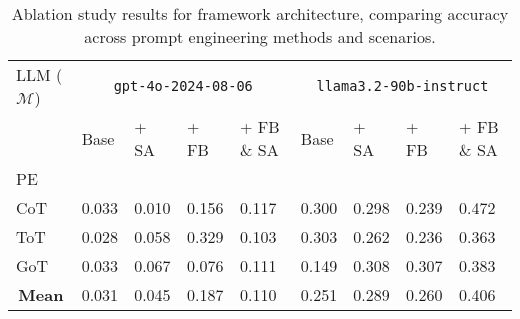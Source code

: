 \begin{table*}[!t]
\caption{Ablation study results for framework architecture, comparing accuracy across prompt engineering methods and scenarios.}
\label{tab:ablation_study}
\begin{tabular}{p{2.2cm}|p{1.5cm}p{1.5cm}p{1.5cm}p{1.5cm}|p{1.5cm}p{1.5cm}p{1.5cm}p{1.5cm}}
\toprule
LLM ($\mathcal{M}$) & \multicolumn{4}{c|}{\texttt{gpt-4o-2024-08-06}} & \multicolumn{4}{c}{\texttt{llama3.2-90b-instruct}} \\
 & Base & + SA & + FB & + FB \& SA & Base & + SA & + FB & + FB \& SA \\
PE &  &  &  &  &  &  &  &  \\
\midrule
CoT & 0.033 & 0.010 & 0.156 & 0.117 & 0.300 & 0.298 & 0.239 & 0.472 \\
ToT & 0.028 & 0.058 & 0.329 & 0.103 & 0.303 & 0.262 & 0.236 & 0.363 \\
GoT & 0.033 & 0.067 & 0.076 & 0.111 & 0.149 & 0.308 & 0.307 & 0.383 \\
\midrule
\multicolumn{1}{c|}{\textbf{Mean}} & 0.031 & 0.045 & 0.187 & 0.110 & 0.251 & 0.289 & 0.260 & 0.406 \\
\bottomrule
\end{tabular}
\end{table*}